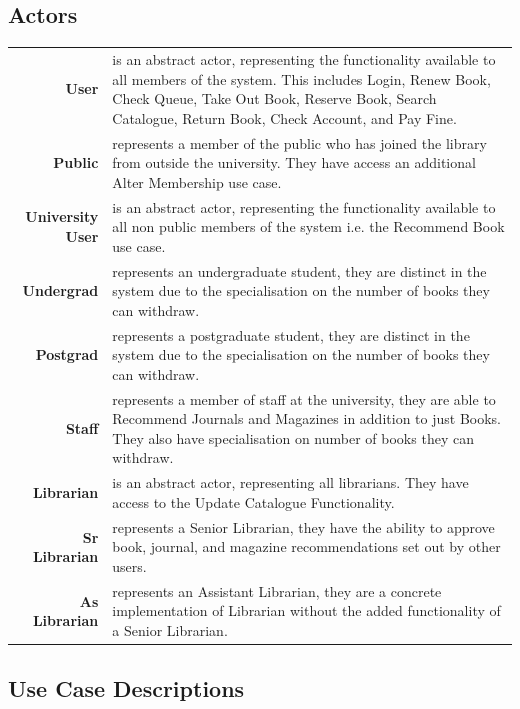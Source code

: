 \subsection{Actors}

\begingroup
\def\arraystretch{1.5}
\begin{longtabu}{>{\bfseries}r X}
    User & is an abstract actor, representing the functionality available to all members of the system. This includes Login, Renew Book, Check Queue, Take Out Book, Reserve Book, Search Catalogue, Return Book, Check Account, and Pay Fine. \\
    Public & represents a member of the public who has joined the library from outside the university. They have access an additional Alter Membership use case. \\
    University User & is an abstract actor, representing the functionality available to all non public members of the system i.e. the Recommend Book use case. \\
    Undergrad & represents an undergraduate student, they are distinct in the system due to the specialisation on the number of books they can withdraw. \\
    Postgrad & represents a postgraduate student, they are distinct in the system due to the specialisation on the number of books they can withdraw. \\
    Staff & represents a member of staff at the university, they are able to Recommend Journals and Magazines in addition to just Books. They also have specialisation on number of books they can withdraw. \\
    Librarian & is an abstract actor, representing all librarians. They have access to the Update Catalogue Functionality. \\
    Sr Librarian & represents a Senior Librarian, they have the ability to approve book, journal, and magazine recommendations set out by other users. \\
    As Librarian & represents an Assistant Librarian, they are a concrete implementation of Librarian without the added functionality of a Senior Librarian.
\end{longtabu}
\endgroup

\pagebreak
\subsection{Use Case Descriptions}

